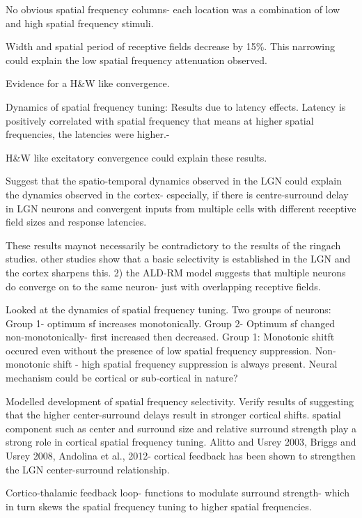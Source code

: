 \documentclass {report}
\begin{document}
\cite{Sirovich2004} No obvious spatial frequency columns- each location was a combination of low and high spatial frequency stimuli. 



\cite{Malone2007} Width and spatial period of receptive fields decrease by 15\%. This narrowing could explain the low spatial frequency attenuation observed.

Evidence for a H\&W like convergence.

\cite{Frazor2008} Dynamics of spatial frequency tuning: Results due to latency effects. Latency is positively correlated with spatial frequency that means at higher spatial frequencies, the latencies were higher.-

H\&W like excitatory convergence  could explain these results.

\cite{Allen2006} Suggest that the spatio-temporal dynamics observed in the LGN could explain the dynamics observed in the cortex- especially, if there is centre-surround delay in LGN neurons and convergent inputs from multiple cells with different receptive field sizes and response latencies.

These results maynot necessarily be contradictory to the results of the ringach studies. other studies show that a basic selectivity is established in the LGN and the cortex sharpens this. 2) the ALD-RM model suggests that multiple neurons do converge on to the same neuron- just with overlapping receptive fields. 

\cite{Purushothaman2014} Looked at the dynamics of spatial frequency tuning. Two groups of neurons: Group 1- optimum sf increases monotonically. Group 2- Optimum sf changed non-monotonically- first increased then decreased. Group 1: Monotonic shitft occured even without the presence of low spatial frequency suppression. Non-monotonic shift - high spatial frequency suppression is always present. Neural mechanism could be cortical or sub-cortical in nature?

\cite{Nirody2014} Modelled development of spatial frequency selectivity. Verify results of \cite{Allen2006} suggesting that the higher center-surround delays result in stronger cortical shifts.
spatial component such as center and surround size and relative surround strength play a strong role in cortical spatial frequency tuning.
Alitto and Usrey 2003, Briggs and Usrey 2008, Andolina et al., 2012- cortical feedback has been shown to strengthen the LGN center-surround relationship.

Cortico-thalamic feedback loop- functions to modulate surround strength- which in turn skews the spatial frequency tuning to higher spatial frequencies. 
\end{document}
